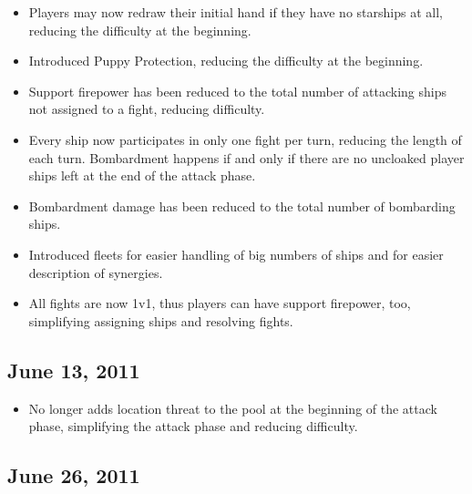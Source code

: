 \documentclass[11pt, a4paper]{article}
\begin{document}
\begin{itemize}
 \item Players may now redraw their initial hand if they have no starships at
all, reducing the difficulty at the beginning.
 \item Introduced Puppy Protection, reducing the difficulty at the beginning.
 \item Support firepower has been reduced to the total number of attacking ships
not assigned to a fight, reducing difficulty.
 \item Every ship now participates in only one fight per turn, reducing the
length of each turn. Bombardment happens if and only if there are no uncloaked
player ships left at the end of the attack phase.
 \item Bombardment damage has been reduced to the total number of bombarding
ships.
 \item Introduced fleets for easier handling of big numbers of ships and for
easier description of synergies.
 \item All fights are now 1v1, thus players can have support firepower, too,
simplifying assigning ships and resolving fights.
\end{itemize}

\subsection{June 13, 2011}

\begin{itemize}
 \item No longer adds location threat to the pool at the beginning of the attack
phase, simplifying the attack phase and reducing difficulty.
\end{itemize}

\subsection{June 26, 2011}
\end{document}
